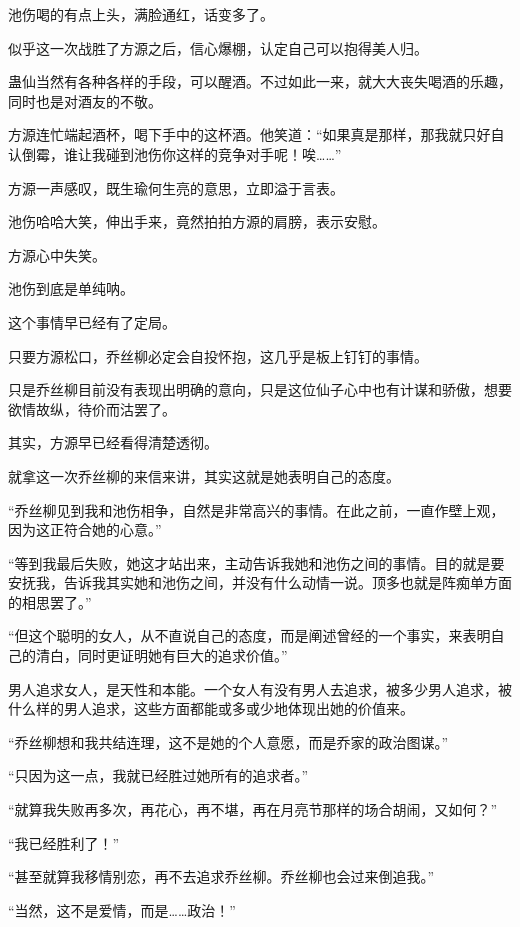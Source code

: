 
\begin{this_body}

池伤喝的有点上头，满脸通红，话变多了。

似乎这一次战胜了方源之后，信心爆棚，认定自己可以抱得美人归。

蛊仙当然有各种各样的手段，可以醒酒。不过如此一来，就大大丧失喝酒的乐趣，同时也是对酒友的不敬。

方源连忙端起酒杯，喝下手中的这杯酒。他笑道：“如果真是那样，那我就只好自认倒霉，谁让我碰到池伤你这样的竞争对手呢！唉……”

方源一声感叹，既生瑜何生亮的意思，立即溢于言表。

池伤哈哈大笑，伸出手来，竟然拍拍方源的肩膀，表示安慰。

方源心中失笑。

池伤到底是单纯呐。

这个事情早已经有了定局。

只要方源松口，乔丝柳必定会自投怀抱，这几乎是板上钉钉的事情。

只是乔丝柳目前没有表现出明确的意向，只是这位仙子心中也有计谋和骄傲，想要欲情故纵，待价而沽罢了。

其实，方源早已经看得清楚透彻。

就拿这一次乔丝柳的来信来讲，其实这就是她表明自己的态度。

“乔丝柳见到我和池伤相争，自然是非常高兴的事情。在此之前，一直作壁上观，因为这正符合她的心意。”

“等到我最后失败，她这才站出来，主动告诉我她和池伤之间的事情。目的就是要安抚我，告诉我其实她和池伤之间，并没有什么动情一说。顶多也就是阵痴单方面的相思罢了。”

“但这个聪明的女人，从不直说自己的态度，而是阐述曾经的一个事实，来表明自己的清白，同时更证明她有巨大的追求价值。”

男人追求女人，是天性和本能。一个女人有没有男人去追求，被多少男人追求，被什么样的男人追求，这些方面都能或多或少地体现出她的价值来。

“乔丝柳想和我共结连理，这不是她的个人意愿，而是乔家的政治图谋。”

“只因为这一点，我就已经胜过她所有的追求者。”

“就算我失败再多次，再花心，再不堪，再在月亮节那样的场合胡闹，又如何？”

“我已经胜利了！”

“甚至就算我移情别恋，再不去追求乔丝柳。乔丝柳也会过来倒追我。”

“当然，这不是爱情，而是……政治！”


\end{this_body}
